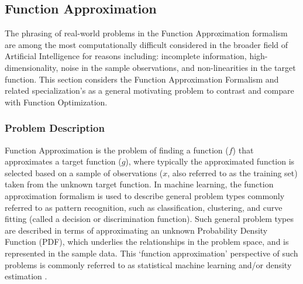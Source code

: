 \begin{bibunit}
% 
%
\subsection{Function Approximation}
\label{subsec:function_approximation}
The phrasing of real-world problems in the Function Approximation formalism are among the most computationally difficult considered in the broader field of Artificial Intelligence for reasons including: incomplete information, high-dimensionality, noise in the sample observations, and non-linearities in the target function.
This section considers the Function Approximation Formalism and related specialization's as a general motivating problem to contrast and compare with Function Optimization.

%
%
\subsubsection{Problem Description}
Function Approximation is the problem of finding a function ($f$) that approximates a target function ($g$), where typically the approximated function is selected based on a sample of observations ($x$, also referred to as the training set) taken from the unknown target function.
In machine learning, the function approximation formalism is used to describe general problem types commonly referred to as pattern recognition, such as classification, clustering, and curve fitting (called a decision or discrimination function). Such general problem types are described in terms of approximating an unknown Probability Density Function (PDF), which underlies the relationships in the problem space, and is represented in the sample data. This `function approximation' perspective of such problems is commonly referred to as statistical machine learning and/or density estimation \cite{Fukunaga1990, Bishop1995}.

%
%

\end{bibunit}
